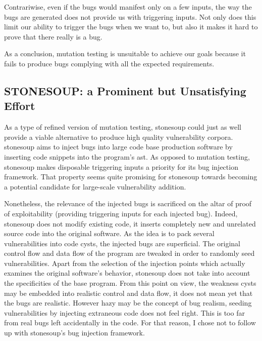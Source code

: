 Contrariwise, even if the bugs would manifest only on a few inputs, the way the bugs are generated does not provide us with triggering inputs. Not only does this limit our ability to trigger the bugs when we want to, but also it makes it hard to prove that there really is a bug.

As a conclusion, mutation testing is unsuitable to achieve our goals because it fails to produce bugs complying with all the expected requirements.

\subsection{STONESOUP: a Prominent but Unsatisfying Effort}

\vspace{0.4cm}

As a type of refined version of mutation testing, \gls{stonesoup} could just as well provide a viable alternative to produce high quality vulnerability corpora. \gls{stonesoup} aims to inject bugs into large code base production software by inserting code snippets into the program's \gls{ast}. As opposed to mutation testing, \gls{stonesoup} makes disposable triggering inputs a priority for its bug injection framework. That property seems quite promising for \gls{stonesoup} towards becoming a potential candidate for large-scale vulnerability addition.

\vspace{0.3cm}

Nonetheless, the relevance of the injected bugs is sacrificed on the altar of proof of exploitability (providing triggering inputs for each injected bug). Indeed, \gls{stonesoup} does not modify existing code, it inserts completely new and unrelated source code into the original software. As the idea is to pack several vulnerabilities into code cysts, the injected bugs are superficial. The original control flow and data flow of the program are tweaked in order to randomly seed vulnerabilities. Apart from the selection of the injection points which actually examines the original software's behavior, \gls{stonesoup} does not take into account the specificities of the base program. From this point on view, the weakness cysts may be embedded into realistic control and data flow, it does not mean yet that the bugs are realistic. However hazy may be the concept of bug realism, seeding vulnerabilities by injecting extraneous code does not feel right. This is too far from real bugs left accidentally in the code. For that reason, I chose not to follow up with \gls{stonesoup}'s bug injection framework.

